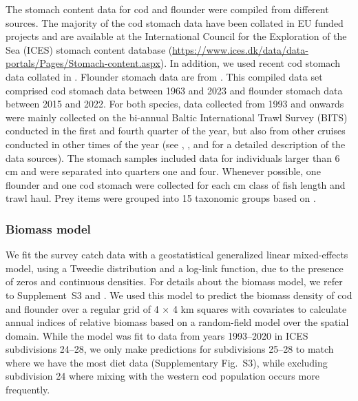 \documentclass[12pt]{article}
\begin{document}
The stomach content data for cod and flounder were compiled from different sources. The majority of the cod stomach data have been collated in EU funded projects \citep{huwerStudyStomachContent2014, jacobsenStudyStomachContent2023} and are available at the International Council for the Exploration of the Sea (ICES) stomach content database (\url{https://www.ices.dk/data/data-portals/Pages/Stomach-content.aspx}). In addition, we used recent cod stomach data collated in \citep{lindmarkWeakEffectsLocal2025a}. Flounder stomach data are from \citep{lindmark2025quantifying}. This compiled data set comprised cod stomach data between 1963 and 2023 and flounder stomach data between 2015 and 2022. For both species, data collected from 1993 and onwards were mainly collected on the bi-annual Baltic International Trawl Survey (BITS) conducted in the first and fourth quarter of the year, but also from other cruises conducted in other times of the year (see \citep{huwerStudyStomachContent2014}, \citep{jacobsenStudyStomachContent2023}, and \citep{lindmark2025quantifying, lindmarkWeakEffectsLocal2025a} for a detailed description of the data sources). The stomach samples included data for individuals larger than 6 cm and were separated into quarters one and four. Whenever possible, one flounder and one cod stomach were collected for each cm class of fish length and trawl haul. Prey items were grouped into 15 taxonomic groups based on \citep{Haase2020}.

\subsubsection*{Biomass model}
We fit the survey catch data with a geostatistical generalized linear mixed-effects model, using a Tweedie distribution \citep{Tweedie1984, Shono2008, sdmTMB} and a log-link function, due to the presence of zeros and continuous densities. For details about the biomass model, we refer to Supplement~S3 and \citep{Lindmark2023}. We used this model to predict the biomass density of cod and flounder over a regular grid of 4 $\times$ 4 km squares with covariates to calculate annual indices of relative biomass based on a random-field model \citep{Shelton2014, Thorson2015} over the spatial domain. While the model was fit to data from years 1993–2020 in ICES subdivisions 24--28, we only make predictions for subdivisions 25--28 to match where we have the most diet data (Supplementary Fig.~S3), while excluding subdivision 24 where mixing with the western cod population occurs more frequently.
\end{document}
